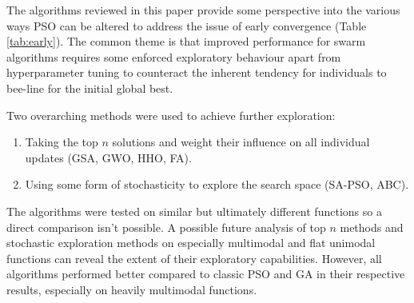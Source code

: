\documentclass[a4paper, 12pt]{extarticle}
\begin{document}
The algorithms reviewed in this paper provide some perspective into the various ways PSO can be altered to address the issue of early convergence (Table \ref{tab:early}). The common theme is that improved performance for swarm algorithms requires some enforced exploratory behaviour apart from hyperparameter tuning to counteract the inherent tendency for individuals to bee-line for the initial global best.

Two overarching methods were used to achieve further exploration:
\begin{enumerate}
    \item Taking the top $n$ solutions and weight their influence on all individual updates (GSA, GWO, HHO, FA).
    \item Using some form of stochasticity to explore the search space (SA-PSO, ABC).
\end{enumerate}

The algorithms were tested on similar but ultimately different functions so a direct comparison isn't possible. A possible future analysis of top $n$ methods and stochastic exploration methods on especially multimodal and flat unimodal functions can reveal the extent of their exploratory capabilities. However, all algorithms performed better compared to classic PSO and GA in their respective results, especially on heavily multimodal functions. 



\newpage

\printbibliography
\end{document}
